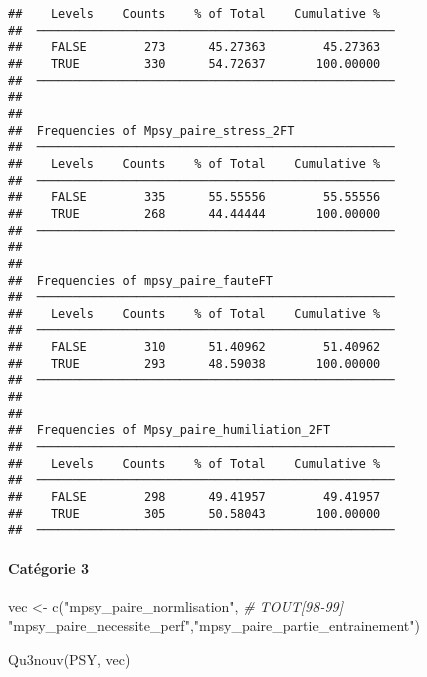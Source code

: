 \documentclass[
]{article}
\newenvironment{Shaded}{\begin{snugshade}}{\end{snugshade}}
\newcommand{\CommentTok}[1]{\textcolor[rgb]{0.56,0.35,0.01}{\textit{#1}}}
\newcommand{\FunctionTok}[1]{\textcolor[rgb]{0.00,0.00,0.00}{#1}}
\newcommand{\NormalTok}[1]{#1}
\newcommand{\OtherTok}[1]{\textcolor[rgb]{0.56,0.35,0.01}{#1}}
\newcommand{\StringTok}[1]{\textcolor[rgb]{0.31,0.60,0.02}{#1}}
\begin{document}
\begin{verbatim}
##    Levels    Counts    % of Total    Cumulative %   
##  ────────────────────────────────────────────────── 
##    FALSE        273      45.27363        45.27363   
##    TRUE         330      54.72637       100.00000   
##  ────────────────────────────────────────────────── 
## 
## 
##  Frequencies of Mpsy_paire_stress_2FT               
##  ────────────────────────────────────────────────── 
##    Levels    Counts    % of Total    Cumulative %   
##  ────────────────────────────────────────────────── 
##    FALSE        335      55.55556        55.55556   
##    TRUE         268      44.44444       100.00000   
##  ────────────────────────────────────────────────── 
## 
## 
##  Frequencies of mpsy_paire_fauteFT                  
##  ────────────────────────────────────────────────── 
##    Levels    Counts    % of Total    Cumulative %   
##  ────────────────────────────────────────────────── 
##    FALSE        310      51.40962        51.40962   
##    TRUE         293      48.59038       100.00000   
##  ────────────────────────────────────────────────── 
## 
## 
##  Frequencies of Mpsy_paire_humiliation_2FT          
##  ────────────────────────────────────────────────── 
##    Levels    Counts    % of Total    Cumulative %   
##  ────────────────────────────────────────────────── 
##    FALSE        298      49.41957        49.41957   
##    TRUE         305      50.58043       100.00000   
##  ──────────────────────────────────────────────────
\end{verbatim}

\hypertarget{catuxe9gorie-3}{%
\paragraph{Catégorie 3}\label{catuxe9gorie-3}}

\begin{Shaded}
\begin{Highlighting}[]
\NormalTok{vec }\OtherTok{\textless{}{-}} \FunctionTok{c}\NormalTok{(}\StringTok{"mpsy\_paire\_normlisation"}\NormalTok{,   }\CommentTok{\# TOUT[98{-}99]}
         \StringTok{"mpsy\_paire\_necessite\_perf"}\NormalTok{,}\StringTok{"mpsy\_paire\_partie\_entrainement"}\NormalTok{)  }

\FunctionTok{Qu3nouv}\NormalTok{(PSY, vec)}
\end{Highlighting}
\end{Shaded}
\end{document}
